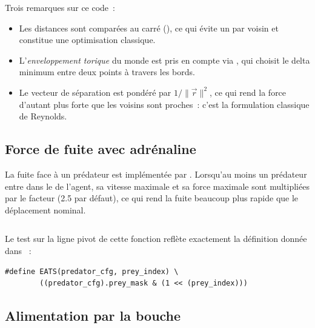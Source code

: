 \begin{listing}[ht]
\inputminted[firstline=56, lastline=125]{c}{../src/entity.c}
\caption{Calcul des trois forces de banc (extrait de ).}
\label{lst:force-boids}
\end{listing}

Trois remarques sur ce code~:

\begin{itemize}
  \item Les distances sont comparées au carré
    (), ce qui évite un
     par voisin et constitue une optimisation
    classique.
  \item L'\emph{enveloppement torique} du monde est pris en
    compte via , qui choisit le delta
    minimum entre deux points à travers les bords.
  \item Le vecteur de séparation est pondéré par
    $1/\|\vec{r}\|^2$, ce qui rend la force d'autant plus forte
    que les voisins sont proches~: c'est la formulation classique
    de Reynolds.
\end{itemize}

\subsection{Force de fuite avec adrénaline}

La fuite face à un prédateur est implémentée par
. Lorsqu'au moins un prédateur entre dans le
 de l'agent, sa vitesse maximale et sa force
maximale sont multipliées par le facteur 
(2.5 par défaut), ce qui rend la fuite beaucoup plus rapide que
le déplacement nominal.

\begin{listing}[ht]
\inputminted[firstline=127, lastline=173]{c}{../src/entity.c}
\caption{Force de fuite avec boost d'adrénaline (extrait de ).}
\label{lst:force-flee}
\end{listing}

Le test  sur la ligne pivot de cette fonction reflète
exactement la définition donnée dans ~:

\begin{verbatim}
#define EATS(predator_cfg, prey_index) \
        ((predator_cfg).prey_mask & (1 << (prey_index)))
\end{verbatim}

\subsection{Alimentation par la bouche}

